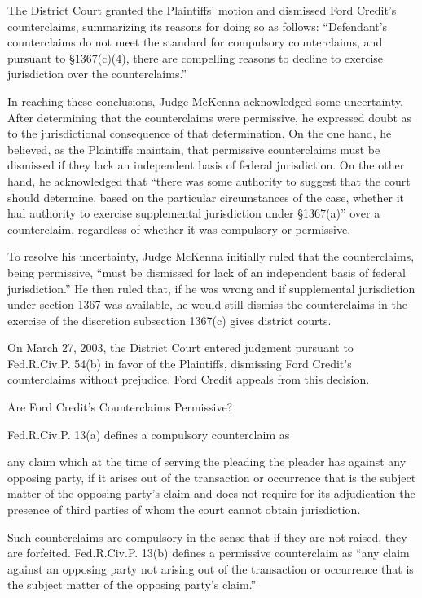 \documentclass[11pt,letterpaper,twoside]{article}
\renewenvironment{quote}{%
   \list{}{%
     \leftmargin2em   %
     \rightmargin\leftmargin\parsep .1em }
   \item\relax
}
{\endlist}
\begin{document}
The District Court granted the Plaintiffs' motion and dismissed Ford
Credit's counterclaims, summarizing its reasons for doing so as follows:
``Defendant's counterclaims do not meet the standard for compulsory
counterclaims, and pursuant to §1367(c)(4), there are compelling reasons
to decline to exercise jurisdiction over the counterclaims.''

In reaching these conclusions, Judge McKenna acknowledged some
uncertainty. After determining that the counterclaims were permissive,
he expressed doubt as to the jurisdictional consequence of that
determination. On the one hand, he believed, as the Plaintiffs maintain,
that permissive counterclaims must be dismissed if they lack an
independent basis of federal jurisdiction. On the other hand, he
acknowledged that ``there was some authority to suggest that the court
should determine, based on the particular circumstances of the case,
whether it had authority to exercise supplemental jurisdiction under
§1367(a)'' over a counterclaim, regardless of whether it was compulsory
or permissive.

To resolve his uncertainty, Judge McKenna initially ruled that the
counterclaims, being permissive, ``must be dismissed for lack of an
independent basis of federal jurisdiction.'' He then ruled that, if he
was wrong and if supplemental jurisdiction under section 1367 was
available, he would still dismiss the counterclaims in the exercise of
the discretion subsection 1367(c) gives district courts.

On March 27, 2003, the District Court entered judgment pursuant to
Fed.R.Civ.P. 54(b) in favor of the Plaintiffs, dismissing Ford Credit's
counterclaims without prejudice. Ford Credit appeals from this decision.

{Are Ford Credit's Counterclaims Permissive?}

Fed.R.Civ.P. 13(a) defines a compulsory counterclaim as

\begin{quote}
any claim which at the time of serving the pleading the pleader has
against any opposing party, if it arises out of the transaction or
occurrence that is the subject matter of the opposing party's claim and
does not require for its adjudication the presence of third parties of
whom the court cannot obtain jurisdiction.
\end{quote}

Such counterclaims are compulsory in the sense that if they are not
raised, they are forfeited. Fed.R.Civ.P. 13(b) defines a permissive
counterclaim as ``any claim against an opposing party not arising out of
the transaction or occurrence that is the subject matter of the opposing
party's claim.''
\end{document}
